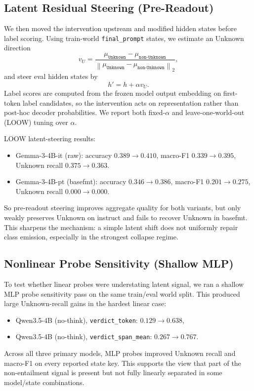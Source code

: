 \documentclass[11pt]{article}
\begin{document}
\subsection{Latent Residual Steering (Pre-Readout)}
We then moved the intervention upstream and modified hidden states before label scoring.
Using train-world \texttt{final\_prompt} states, we estimate an Unknown direction
\[
v_U = \frac{\mu_{\texttt{Unknown}} - \mu_{\texttt{non-Unknown}}}{\left\lVert \mu_{\texttt{Unknown}} - \mu_{\texttt{non-Unknown}}\right\rVert_2},
\]
and steer eval hidden states by
\[
h' = h + \alpha v_U.
\]
Label scores are computed from the frozen model output embedding on first-token label candidates, so the intervention acts on representation rather than post-hoc decoder probabilities.
We report both fixed-\(\alpha\) and leave-one-world-out (LOOW) tuning over \(\alpha\).

LOOW latent-steering results:
\begin{itemize}
  \item Gemma-3-4B-it (raw): accuracy \(0.389\to0.410\), macro-F1 \(0.339\to0.395\), Unknown recall \(0.375\to0.363\).
  \item Gemma-3-4B-pt (basefmt): accuracy \(0.346\to0.386\), macro-F1 \(0.201\to0.275\), Unknown recall \(0.000\to0.000\).
\end{itemize}
So pre-readout steering improves aggregate quality for both variants, but only weakly preserves Unknown on instruct and fails to recover Unknown in basefmt.
This sharpens the mechanism: a simple latent shift does not uniformly repair class emission, especially in the strongest collapse regime.

\subsection{Nonlinear Probe Sensitivity (Shallow MLP)}
To test whether linear probes were understating latent signal, we ran a shallow MLP probe sensitivity pass on the same train/eval world split.
This produced large Unknown-recall gains in the hardest linear case:
\begin{itemize}
  \item Qwen3.5-4B (no-think), \texttt{verdict\_token}: \(0.129 \to 0.638\),
  \item Qwen3.5-4B (no-think), \texttt{verdict\_span\_mean}: \(0.267 \to 0.767\).
\end{itemize}
Across all three primary models, MLP probes improved Unknown recall and macro-F1 on every reported state key.
This supports the view that part of the non-entailment signal is present but not fully linearly separated in some model/state combinations.
\end{document}
